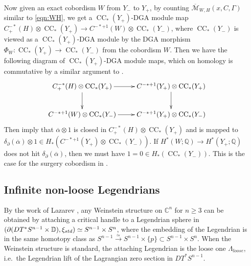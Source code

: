 \documentclass[reqno,11pt]{amsart}
\numberwithin{equation}{section}
\def\C{{\mathbb C}}
\def\D{{\mathbb D}}
\def\Q{{\mathbb Q}}
\def\cM{{\mathcal M}}
\def\std{\rm std}
\DeclareMathOperator{\CC}{CC}
\begin{document}
Now given an exact cobordism $W$ from $Y_-$ to $Y_+$, by counting $\overline{\cM}_{W,H}(x,C,\Gamma)$ similar to \eqref{eqn:WH}, we get a $\CC_*(Y_+)$-DGA module map $C^{-*}_+(H)\otimes\CC_*(Y_+)\to C^{-*+1}(W)\otimes \CC_*(Y_-)$, where $\CC_*(Y_-)$ is viewed as a $\CC_*(Y_+)$-DGA module by the DGA morphism $\Phi_{W}:\CC_*(Y_+)\to \CC_*(Y_-)$ from the cobordism $W$. Then we have the following diagram of $\CC_*(Y_+)$-DGA module maps, which on homology is commutative by a similar argument to \cite[Proposition 3.2]{zbMATH07367119}. 
$$
\xymatrix{
C_+^{-*}(H)\otimes \CC_*(Y_+)\ar[d] \ar[r] & C^{-*+1}(Y_+)\otimes \CC_*(Y_+)\ar[d]\\
C^{-*+1}(W) \otimes \CC_*(Y_-)\ar[r] & C^{-*+1}(Y_+)\otimes \CC_*(Y_-)}
$$
Then  imply that $\overline{\alpha}\otimes 1$ is closed in $C_+^{-*}(H)\otimes \CC_*(Y_+)$ and is mapped to $\delta_{\partial}(\overline{\alpha})\otimes 1\in H_*(C^{-*+1}(Y_+)\otimes \CC_*(Y_-))$. If $H^*(W;\Q)\to H^*(Y_+;\Q)$ does not hit $\delta_{\partial}(\overline{\alpha})$, then we must have $1=0\in H_*(\CC_*(Y_-))$. This is the case for the surgery cobordism in .




\subsection{Infinite non-loose Legendrians}\label{ss:44}
By the work of Lazarev \cite{zbMATH07305775}, any Weinstein structure on $\C^n$ for $n\ge 3$ can be obtained by attaching a critical handle to a Legendrian sphere in $(\partial(DT^*S^{n-1}\times \D),\xi_{\std})\simeq S^{n-1}\times S^n$, where the embedding of the Legendrian is in the same homotopy class as $S^{n-1}\stackrel{\simeq}{\to} S^{n-1}\times \{p\}\subset S^{n-1}\times S^n$. When the Weinstein structure is standard, the attaching Legendrian is the loose one $\Lambda_{loose}$, i.e.\ the Legendrian lift of the Lagrangian zero section in $DT^*S^{n-1}$. 
\end{document}
